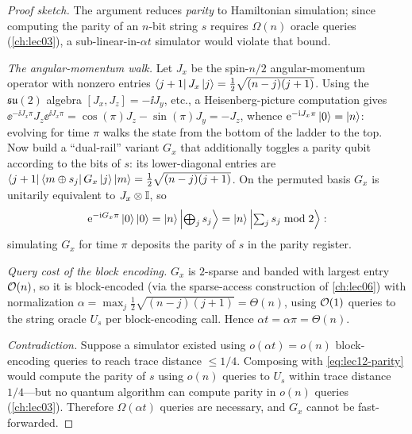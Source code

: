 \begin{proof}[Proof sketch]
The argument reduces \emph{parity} to Hamiltonian simulation; since computing the parity of
an $n$-bit string $s$ requires $\Omega(n)$ oracle queries (\cref{ch:lec03}), a
sub-linear-in-$\alpha t$ simulator would violate that bound.

\emph{The angular-momentum walk.} Let $J_x$ be the spin-$n/2$ angular-momentum operator
with nonzero entries $\bra{j+1}J_x\ket j=\tfrac12\sqrt{(n-j)(j+1)}$. Using the
$\mathfrak{su}(2)$ algebra $[J_x,J_z]=-\ii J_y$, etc., a Heisenberg-picture computation
gives $\ee^{-\ii J_x\pi}J_z\ee^{\ii J_x\pi}=\cos(\pi)J_z-\sin(\pi)J_y=-J_z$, whence
$\mathrm{e}^{-\mathrm{i} J_x\pi}\ket0=\ket n$: evolving for time $\pi$ walks the state from the bottom of
the ladder to the top. Now build a ``dual-rail'' variant $G_x$ that additionally toggles a
parity qubit according to the bits of $s$: its lower-diagonal entries are
$\bra{j+1}\bra{m\oplus s_j}G_x\ket j\ket m=\tfrac12\sqrt{(n-j)(j+1)}$. On the permuted basis
$G_x$ is unitarily equivalent to $J_x\otimes\mathbb{I}$, so
\begin{equation}
  \mathrm{e}^{-\mathrm{i} G_x\pi}\ket0\ket0=\ket n\Bigl|\textstyle\bigoplus_j s_j\Bigr\rangle
  =\ket n\Bigl|\textstyle\sum_j s_j\bmod2\Bigr\rangle:
  \label{eq:lec12-parity}
\end{equation}
simulating $G_x$ for time $\pi$ deposits the parity of $s$ in the parity register.

\emph{Query cost of the block encoding.} $G_x$ is $2$-sparse and banded with largest entry
$\mathcal{O}(n)$, so it is block-encoded (via the sparse-access construction of \cref{ch:lec06})
with normalization
$\alpha=\max_j\tfrac12\sqrt{(n-j)(j+1)}=\Theta(n)$, using $\mathcal{O}(1)$ queries to the string
oracle $U_s$ per block-encoding call. Hence $\alpha t=\alpha\pi=\Theta(n)$.

\emph{Contradiction.} Suppose a simulator existed using $o(\alpha t)=o(n)$ block-encoding
queries to reach trace distance $\le1/4$. Composing with \eqref{eq:lec12-parity} would
compute the parity of $s$ using $o(n)$ queries to $U_s$ within trace distance $1/4$---but no
quantum algorithm can compute parity in $o(n)$ queries (\cref{ch:lec03}). Therefore
$\Omega(\alpha t)$ queries are necessary, and $G_x$ cannot be fast-forwarded.
\end{proof}

